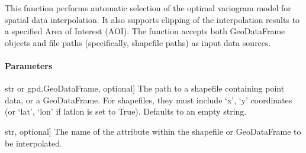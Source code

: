 \documentclass[letterpaper,10pt,english]{sphinxmanual}
\begin{document}
\begin{fulllineitems}
\label{\detokenize{akhdefo_functions:akhdefo_functions.Akhdefo_utils.Auto_Variogram}}
\pysigstartsignatures
{}
\pysigstopsignatures
\sphinxAtStartPar
This function performs automatic selection of the optimal variogram model for spatial data interpolation. 
It also supports clipping of the interpolation results to a specified Area of Interest (AOI). The function 
accepts both GeoDataFrame objects and file paths (specifically, shapefile paths) as input data sources.


\paragraph{Parameters}
\label{\detokenize{akhdefo_functions:id21}}\begin{description}
\sphinxlineitem{data}{[}str or gpd.GeoDataFrame, optional{]}
\sphinxAtStartPar
The path to a shapefile containing point data, or a GeoDataFrame. For shapefiles, they must include 
‘x’, ‘y’ coordinates (or ‘lat’, ‘lon’ if latlon is set to True). Defaults to an empty string.

\sphinxlineitem{column\_attribute}{[}str, optional{]}
\sphinxAtStartPar
The name of the attribute within the shapefile or GeoDataFrame to be interpolated.


\end{description}
\end{fulllineitems}
\end{document}
